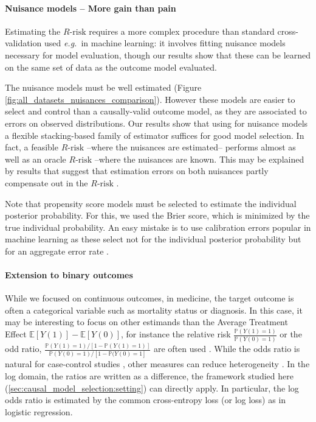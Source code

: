 \documentclass[french,12pt,twoside,a4paper]{book}
\begin{document}
\paragraph{Nuisance models -- More gain than pain}
%
Estimating the $R\text{-risk}$ requires a more complex procedure than
standard cross-validation used \emph{e.g.}~in machine learning: it involves
fitting nuisance models necessary for model evaluation, though our
results show that these can be learned on the same set of data
as the outcome model evaluated.

The nuisance models must be well estimated (Figure
\ref{fig:all_datasets_nuisances_comparison}). However these models are
easier to select and control than a causally-valid outcome model,
as they are associated to errors on
observed distributions. Our results show that using for nuisance models
a flexible stacking-based family of estimator suffices for good model selection.
%
In fact, a feasible $R\text{-risk}$ --where the nuisances
are estimated-- performs almost as well as an oracle $R\text{-risk}$ --where the
nuisances are known. This may be explained by
results that suggest that estimation errors on both
nuisances partly compensate out in the
$R\text{-risk}$ \citep{daniel2018double,kennedy2020optimal,nie_quasioracle_2017,chernozhukov_double_2018,zivich2021machine,naimi2021challenges}.

Note that propensity score models must be selected to estimate
the individual posterior probability. For this, we used the Brier score,
which is minimized by the true individual probability. An easy mistake is to
use calibration errors popular in machine learning
\citep{platt_probabilistic_1999,zadrozny_obtaining_2001,niculescu-mizil_predicting_2005,minderer_revisiting_2021}
as these select not for the individual posterior probability but for an
aggregate error rate \citep{perez2022beyond}.


\paragraph{Extension to binary outcomes}
While we focused on continuous outcomes, in medicine, the target outcome is
often a categorical variable such as mortality status or diagnosis. In this
case, it may be interesting to focus on other estimands than the Average
Treatment Effect $\mathbb{E}[Y(1)] -\mathbb{E}[Y(0)] $, for instance the
relative risk $\frac{\mathbb P(Y(1) = 1)}{\mathbb P(Y(0) = 1)}$ or the odd
ratio, $\frac{\mathbb P(Y(1) = 1) / [1 - \mathbb P(Y(1) =1)]}{\mathbb P(Y(0) =
  1) / [1 - \mathbb P(Y(0) = 1]}$ are often used \citep{austin2017estimating}.
While the odds ratio is natural for case-control studies \citep{rothman2008case},
other measures can reduce heterogeneity \citep{colnet2023risk}. In the log
domain, the ratios are written as a difference, the framework studied here
(\autoref{sec:causal_model_selection:setting}) can directly apply. In
particular, the log odds ratio is estimated by the common cross-entropy loss (or
log loss) as in logistic regression.
\end{document}
